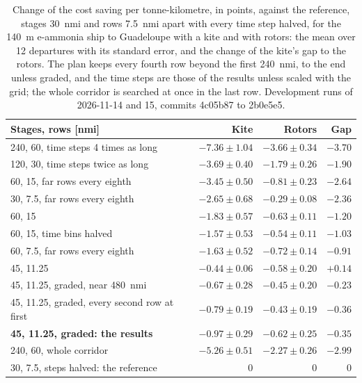 \begin{table}[tbp]
\centering
\footnotesize
\caption{ Change of the cost saving per tonne-kilometre, in points, against the reference, stages \SI{30}{nmi} and rows \SI{7.5}{nmi} apart with every time step halved, for the \SI{140}{m} e-ammonia ship to Guadeloupe with a kite and with rotors: the mean over 12 departures with its standard error, and the change of the kite's gap to the rotors. The plan keeps every fourth row beyond the first \SI{240}{nmi}, to the end unless graded, and the time steps are those of the results unless scaled with the grid; the whole corridor is searched at once in the last row. Development runs of 2026-11-14 and 15, commits 4c05b87 to 2b0e5e5.}
\label{tab:routing_grid}
\begin{tabular}{@{}lrrr@{}}
\toprule
Stages, rows [nmi] & Kite & Rotors & Gap \\
\midrule
240, 60, time steps 4 times as long & $-7.36 \pm 1.04$ & $-3.66 \pm 0.34$ & $-3.70$ \\
120, 30, time steps twice as long & $-3.69 \pm 0.40$ & $-1.79 \pm 0.26$ & $-1.90$ \\
60, 15, far rows every eighth & $-3.45 \pm 0.50$ & $-0.81 \pm 0.23$ & $-2.64$ \\
30, 7.5, far rows every eighth & $-2.65 \pm 0.68$ & $-0.29 \pm 0.08$ & $-2.36$ \\
60, 15 & $-1.83 \pm 0.57$ & $-0.63 \pm 0.11$ & $-1.20$ \\
60, 15, time bins halved & $-1.57 \pm 0.53$ & $-0.54 \pm 0.11$ & $-1.03$ \\
60, 7.5, far rows every eighth & $-1.63 \pm 0.52$ & $-0.72 \pm 0.14$ & $-0.91$ \\
45, 11.25 & $-0.44 \pm 0.06$ & $-0.58 \pm 0.20$ & $+0.14$ \\
45, 11.25, graded, near \SI{480}{nmi} & $-0.67 \pm 0.28$ & $-0.45 \pm 0.20$ & $-0.23$ \\
45, 11.25, graded, every second row at first & $-0.79 \pm 0.19$ & $-0.43 \pm 0.19$ & $-0.36$ \\
\textbf{45, 11.25, graded: the results} & $-0.97 \pm 0.29$ & $-0.62 \pm 0.25$ & $-0.35$ \\
240, 60, whole corridor & $-5.26 \pm 0.51$ & $-2.27 \pm 0.26$ & $-2.99$ \\
30, 7.5, steps halved: the reference & 0 & 0 & 0 \\
\bottomrule
\end{tabular}
\end{table}

